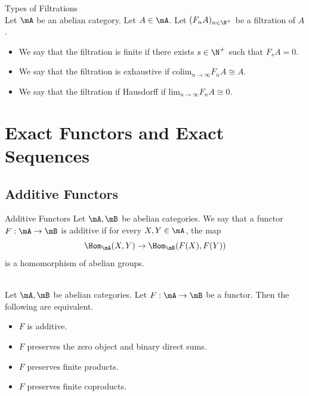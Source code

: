 \documentclass[a4paper]{article}
\begin{document}
\begin{defn}{Types of Filtrations}{}\\
Let $\mA$ be an abelian category. Let $A\in\mA$. Let $(F_nA)_{n\in\N^+}$ be a filtration of $A$. 
\begin{itemize}
\item We say that the filtration is finite if there exists $s\in\N^+$ such that $F_sA=0$. 
\item We say that the filtration is exhaustive if $\text{colim}_{n\to\infty}F_nA\cong A$. 
\item We say that the filtration if Hausdorff if $\text{lim}_{n\to\infty}F_nA\cong 0$. 
\end{itemize}
\end{defn}

\pagebreak
\section{Exact Functors and Exact Sequences}
\subsection{Additive Functors}
\begin{defn}{Additive Functors}{} Let $\mA,\mB$ be abelian categories. We say that a functor $F:\mA\to\mB$ is additive if for every $X,Y\in\mA$, the map $$\Hom_\mA(X,Y)\to\Hom_\mB(F(X),F(Y))$$ is a homomorphism of abelian groups. 
\end{defn}

\begin{prp}{}{}\\
Let $\mA,\mB$ be abelian categories. Let $F:\mA\to\mB$ be a functor. Then the following are equivalent. 
\begin{itemize}
\item $F$ is additive. 
\item $F$ preserves the zero object and binary direct sums. 
\item $F$ preserves finite products. 
\item $F$ preserves finite coproducts. 
\end{itemize}
\end{prp}
\end{document}
